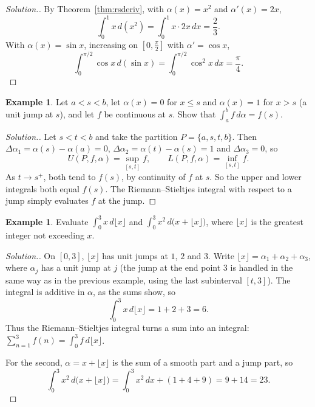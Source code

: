 \documentclass[11pt,a4paper]{article}
\numberwithin{equation}{section}
\theoremstyle{definition}
\newtheorem{exa}[thm]{Example}
\newenvironment{solution}
  {\renewcommand{\qedsymbol}{}\begin{proof}[\textit{Solution}.]}
  {\end{proof}}
\begin{document}
\begin{solution}
By Theorem~\ref{thm:rsderiv}, with $\alpha(x) = x^2$ and $\alpha'(x) = 2x$,
$$\int_0^1x\,d(x^2) = \int_0^1x\cdot 2x\,dx = \frac{2}{3}.$$
With $\alpha(x) = \sin x$, increasing on $\left[0,\frac{\pi}{2}\right]$ with $\alpha' = \cos x$,
$$\int_0^{\pi/2}\cos x\,d(\sin x) = \int_0^{\pi/2}\cos^2x\,dx = \frac{\pi}{4}.$$
\end{solution}


\begin{exa}
Let $a<s<b$, let $\alpha(x) = 0$ for $x\leq s$ and $\alpha(x) = 1$ for $x>s$ (a unit jump at $s$), and let $f$ be continuous at $s$. Show that $\int_a^bf\,d\alpha = f(s)$.
\end{exa}

\begin{solution}
Let $s<t<b$ and take the partition $P = \{a, s, t, b\}$. Then $\Delta\alpha_1 = \alpha(s) - \alpha(a) = 0$, $\Delta\alpha_2 = \alpha(t) - \alpha(s) = 1$ and $\Delta\alpha_3 = 0$, so
$$U(P,f,\alpha) = \sup_{[s,t]}f,\qquad L(P,f,\alpha) = \inf_{[s,t]}f .$$
As $t\longrightarrow s^+$, both tend to $f(s)$, by continuity of $f$ at $s$. So the upper and lower integrals both equal $f(s)$. The Riemann--Stieltjes integral with respect to a jump simply evaluates $f$ at the jump.
\end{solution}


\begin{exa}
Evaluate $\int_0^3x\,d\lfloor x\rfloor$ and $\int_0^3x^2\,d\bigl(x + \lfloor x\rfloor\bigr)$, where $\lfloor x\rfloor$ is the greatest integer not exceeding $x$.
\end{exa}

\begin{solution}
On $[0,3]$, $\lfloor x\rfloor$ has unit jumps at $1$, $2$ and $3$. Write $\lfloor x\rfloor = \alpha_1 + \alpha_2 + \alpha_3$, where $\alpha_j$ has a unit jump at $j$ (the jump at the end point $3$ is handled in the same way as in the previous example, using the last subinterval $[t,3]$). The integral is additive in $\alpha$, as the sums show, so
$$\int_0^3x\,d\lfloor x\rfloor = 1 + 2 + 3 = 6 .$$
Thus the Riemann--Stieltjes integral turns a sum into an integral: $\sum_{n=1}^3f(n) = \int_0^3f\,d\lfloor x\rfloor$.

For the second, $\alpha = x + \lfloor x\rfloor$ is the sum of a smooth part and a jump part, so
$$\int_0^3x^2\,d\bigl(x + \lfloor x\rfloor\bigr) = \int_0^3x^2\,dx + (1 + 4 + 9) = 9 + 14 = 23 .$$
\end{solution}
\end{document}
